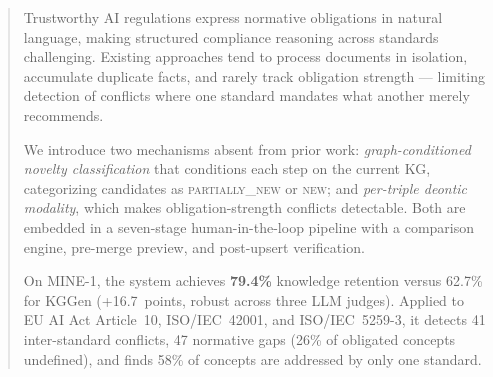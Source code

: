 \begin{abstract}
Trustworthy AI regulations express normative obligations in natural language, making structured
compliance reasoning across standards challenging. Existing approaches tend to process documents
in isolation, accumulate duplicate facts, and rarely track obligation strength — limiting detection
of conflicts where one standard mandates what another merely recommends.

We introduce two mechanisms absent from prior work: \emph{graph-conditioned novelty
classification} that conditions each step on the current KG, categorizing candidates as
\textsc{partially\_new} or \textsc{new}; and \emph{per-triple deontic modality}, which makes
obligation-strength conflicts detectable. Both are embedded in a seven-stage human-in-the-loop
pipeline with a comparison engine, pre-merge preview, and post-upsert verification.

On MINE-1, the system achieves \textbf{79.4\%} knowledge retention versus 62.7\% for KGGen
(+16.7~points, robust across three LLM judges). Applied to EU AI Act Article~10, ISO/IEC~42001,
and ISO/IEC~5259-3, it detects 41 inter-standard conflicts, 47 normative gaps (26\% of obligated
concepts undefined), and finds 58\% of concepts are addressed by only one standard.
\end{abstract}
